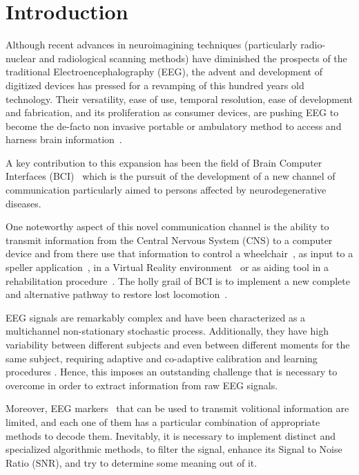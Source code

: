 \documentclass[entropy,article,submit,moreauthors,pdftex,10pt,a4paper]{mdpi}
\begin{document}

\setcounter{section}{-1} %

\section{Introduction}

Although recent advances in neuroimagining techniques (particularly radio-nuclear and radiological scanning methods) \citep{Schomer2010} have diminished the prospects of the traditional Electroencephalography (EEG), the advent and development of digitized devices has pressed for a revamping of this hundred years old technology.  Their versatility, ease of use, temporal resolution, ease of development and fabrication, and its proliferation as consumer devices, are pushing EEG to become the de-facto non invasive portable or ambulatory method to access and harness brain information~\cite{DeVos2014}.

A key contribution to this expansion has been the field of Brain Computer Interfaces (BCI)~\citep{WolpawJonathanR2012} which is the pursuit of the development of a new channel of communication particularly aimed to persons affected by neurodegenerative diseases.

One noteworthy aspect of this novel communication channel is the ability to transmit information from the Central Nervous System (CNS) to a computer device and from there use that information to control a wheelchair~\citep{Carlson2013}, as input to a speller application~\citep{Guger2009a}, in a Virtual Reality environment~\citep{Lotte2013} or as aiding tool in a rehabilitation procedure~\citep{Jure2016}.  The holly grail of BCI is to implement a new complete and alternative pathway to restore lost locomotion~\citep{WolpawJonathanR2012}.

EEG signals are remarkably complex and have been characterized as a multichannel non-stationary stochastic process.  Additionally, they have high variability between different subjects and even between different moments for the same subject, requiring adaptive and co-adaptive calibration and learning procedures \citep{Clerc}.  Hence, this imposes an outstanding challenge that is necessary to overcome in order to extract information from raw EEG signals.

Moreover, EEG markers~\citep{Clerc} that can be used to  transmit volitional information are limited, and each one of them has a particular combination of appropriate methods to decode them. Inevitably, it is necessary to implement  distinct and specialized algorithmic methods, to filter the signal, enhance its Signal to Noise Ratio (SNR), and try to determine some meaning out of it.  
\end{document}
